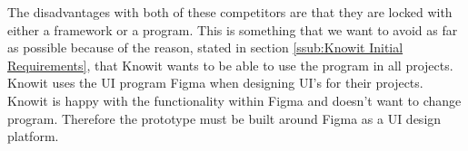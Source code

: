 The disadvantages with both of these competitors are that they are locked with either a framework or a program. This is something that we want to avoid as far as possible because of the reason, stated in section \ref{ssub:Knowit Initial Requirements}, that Knowit wants to be able to use the program in all projects. Knowit uses the UI program Figma when designing UI's for their projects. Knowit is happy with the functionality within Figma and doesn't want to change program. Therefore the prototype must be built around Figma as a UI design platform.





